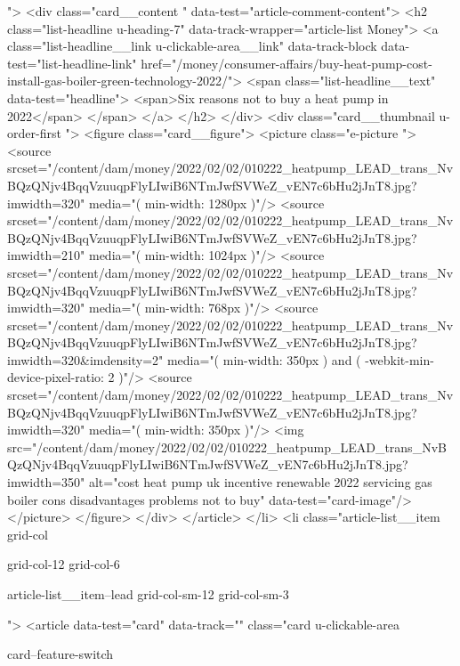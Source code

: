 {{{			
			 ">
<div class="card__content " data-test="article-comment-content">
<h2 class="list-headline  u-heading-7" data-track-wrapper="article-list Money">
<a class="list-headline__link u-clickable-area__link" data-track-block data-test="list-headline-link" href="/money/consumer-affairs/buy-heat-pump-cost-install-gas-boiler-green-technology-2022/">
<span class="list-headline__text" data-test="headline">
<span>Six reasons not to buy a heat pump in 2022</span>
</span>
</a>
</h2>
</div>
<div class="card__thumbnail u-order-first ">
<figure class="card__figure">
<picture class="e-picture   ">
<source srcset="/content/dam/money/2022/02/02/010222_heatpump_LEAD_trans_NvBQzQNjv4BqqVzuuqpFlyLIwiB6NTmJwfSVWeZ_vEN7c6bHu2jJnT8.jpg?imwidth=320" media="( min-width: 1280px )"/>
<source srcset="/content/dam/money/2022/02/02/010222_heatpump_LEAD_trans_NvBQzQNjv4BqqVzuuqpFlyLIwiB6NTmJwfSVWeZ_vEN7c6bHu2jJnT8.jpg?imwidth=210" media="( min-width: 1024px )"/>
<source srcset="/content/dam/money/2022/02/02/010222_heatpump_LEAD_trans_NvBQzQNjv4BqqVzuuqpFlyLIwiB6NTmJwfSVWeZ_vEN7c6bHu2jJnT8.jpg?imwidth=320" media="( min-width: 768px )"/>
<source srcset="/content/dam/money/2022/02/02/010222_heatpump_LEAD_trans_NvBQzQNjv4BqqVzuuqpFlyLIwiB6NTmJwfSVWeZ_vEN7c6bHu2jJnT8.jpg?imwidth=320&imdensity=2" media="( min-width: 350px ) and ( -webkit-min-device-pixel-ratio: 2 )"/>
<source srcset="/content/dam/money/2022/02/02/010222_heatpump_LEAD_trans_NvBQzQNjv4BqqVzuuqpFlyLIwiB6NTmJwfSVWeZ_vEN7c6bHu2jJnT8.jpg?imwidth=320" media="( min-width: 350px )"/>
<img src="/content/dam/money/2022/02/02/010222_heatpump_LEAD_trans_NvBQzQNjv4BqqVzuuqpFlyLIwiB6NTmJwfSVWeZ_vEN7c6bHu2jJnT8.jpg?imwidth=350" alt="cost heat pump uk incentive renewable 2022 servicing gas boiler cons disadvantages problems not to buy" data-test="card-image"/>
</picture>
</figure>
</div>
</article>
</li>
<li class="article-list__item
				grid-col
				
				
				
				grid-col-12
				grid-col-6
				
				
				
				
				article-list__item--lead grid-col-sm-12
				grid-col-sm-3
				
				
				">
<article data-test="card" data-track="" class="card
			u-clickable-area
			
			card--feature-switch
			
			
			
			
			
}}}
